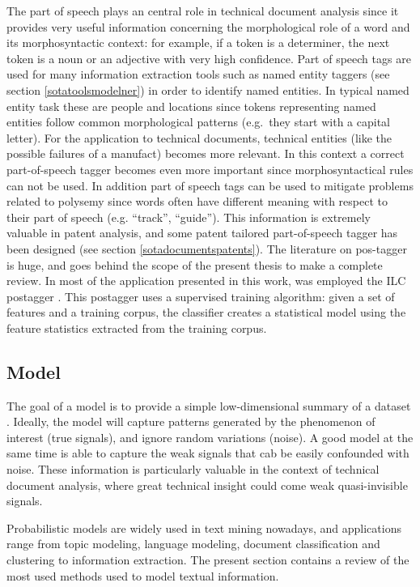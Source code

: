 \documentclass[]{book}
\begin{document}
The part of speech plays an central role in technical document analysis
since it provides very useful information concerning the morphological
role of a word and its morphosyntactic context: for example, if a token
is a determiner, the next token is a noun or an adjective with very high
confidence. Part of speech tags are used for many information extraction
tools such as named entity taggers (see section \ref{sotatoolsmodelner})
in order to identify named entities. In typical named entity task these
are people and locations since tokens representing named entities follow
common morphological patterns (e.g.~they start with a capital letter).
For the application to technical documents, technical entities (like the
possible failures of a manufact) becomes more relevant. In this context
a correct part-of-speech tagger becomes even more important since
morphosyntactical rules can not be used. In addition part of speech tags
can be used to mitigate problems related to polysemy since words often
have different meaning with respect to their part of speech (e.g.
``track'', ``guide''). This information is extremely valuable in patent
analysis, and some patent tailored part-of-speech tagger has been
designed (see section \ref{sotadocumentspatents}). The literature on
pos-tagger is huge, and goes behind the scope of the present thesis to
make a complete review. In most of the application presented in this
work, was employed the ILC postagger \citep{attardi2006experiments}.
This postagger uses a supervised training algorithm: given a set of
features and a training corpus, the classifier creates a statistical
model using the feature statistics extracted from the training corpus.

\subsection{Model}\label{sotatoolsmodel}

The goal of a model is to provide a simple low-dimensional summary of a
dataset \citep{wickham2016r}. Ideally, the model will capture patterns
generated by the phenomenon of interest (true signals), and ignore
random variations (noise). A good model at the same time is able to
capture the weak signals that cab be easily confounded with noise. These
information is particularly valuable in the context of technical
document analysis, where great technical insight could come weak
quasi-invisible signals. \citep{james2013introduction}

Probabilistic models are widely used in text mining nowadays, and
applications range from topic modeling, language modeling, document
classification and clustering to information extraction. The present
section contains a review of the most used methods used to model textual
information.
\end{document}
